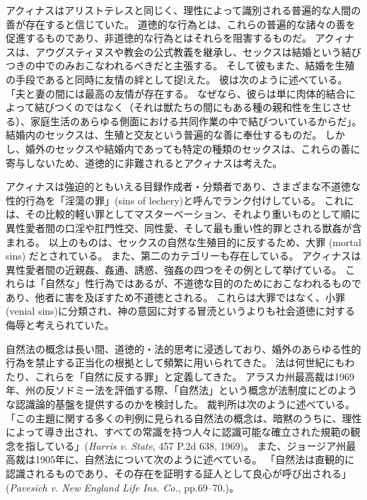 \documentclass[paper=a4,book,openany]{jlreq}
\begin{document}
アクィナスはアリストテレスと同じく、理性によって識別される普遍的な人間の善が存在すると信じていた。
道徳的な行為とは、これらの普遍的な諸々の善を促進するものであり、非道徳的な行為とはそれらを阻害するものだ。
アクィナスは、アウグスティヌスや教会の公式教義を継承し、セックスは結婚という結びつきの中でのみおこなわれるべきだと主張する。
そして彼もまた、結婚を生殖の手段であると同時に友情の絆として捉lえた。
彼は次のように述べている。
「夫と妻の間には最高の友情が存在する。
なぜなら、彼らは単に肉体的結合によって結びつくのではなく（それは獣たちの間にもある種の親和性を生じさせる）、家庭生活のあらゆる側面における共同作業の中で結びついているからだ」\citep[Bk.3 Pt. 2 Chap. 123]{aquinas55:_summa_gentil}。
結婚内のセックスは、生殖と交友という普遍的な善に奉仕するものだ。
しかし、婚外のセックスや結婚内であっても特定の種類のセックスは、これらの善に寄与しないため、道徳的に非難されるとアクィナスは考えた。

アクィナスは強迫的ともいえる目録作成者・分類者であり、さまざまな不道徳な性的行為を「淫蕩の罪」(sins of lechery)と呼んでランク付けしている。
これには、その比較的軽い罪としてマスターベーション、それより重いものとして順に異性愛者間の口淫や肛門性交、同性愛、そして最も重い性的罪とされる獣姦が含まれる。
以上のものは、セックスの自然な生殖目的に反するため、大罪 (mortal sins) だとされている。
また、第二のカテゴリーも存在している。
アクィナスは異性愛者間の近親姦、姦通、誘惑、強姦の四つをその例として挙げている。
これらは「自然な」性行為ではあるが、不道徳な目的のためにおこなわれるものであり、他者に害を及ぼすため不道徳とされる。
これらは大罪ではなく、小罪(venial sins)に分類され、神の意図に対する冒涜というよりも社会道徳に対する侮辱と考えられていた\citep[cf.][II.ii, Question 154]{aquinas20:_summa_theol}。

自然法の概念は長い間、道徳的・法的思考に浸透しており、婚外のあらゆる性的行為を禁止する正当化の根拠として頻繁に用いられてきた。
法は何世紀にもわたり、これらを「自然に反する罪」と定義してきた。
アラスカ州最高裁は1969年、州の反ソドミー法を評価する際、「自然法」という概念が法制度にどのような認識論的基盤を提供するのかを検討した。
裁判所は次のように述べている。
「この主題に関する多くの判例に見られる自然法の概念は、暗黙のうちに、理性によって導き出され、すべての常識を持つ人々に認識可能な確立された規範の観念を指している」(\emph{Harris v. State}, 457 P.2d 638, 1969)。
また、ジョージア州最高裁は1905年に、自然法について次のように述べている。
「自然法は直観的に認識されるものであり、その存在を証明する証人として良心が呼び出される」(\emph{Pavesich v. New England Life Ins. Co.}, pp.69--70.)。
\end{document}
